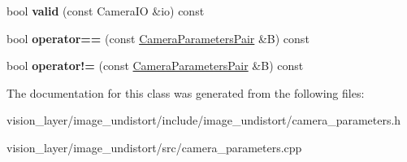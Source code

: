 \begin{DoxyCompactItemize}
bool {\bfseries valid} (const Camera\+IO \&io) const
\item 
\mbox{\label{classimage__undistort_1_1CameraParametersPair_a8eca6daae8442e95a6612f76543a1de9}} 
bool {\bfseries operator==} (const \hyperlink{classimage__undistort_1_1CameraParametersPair}{Camera\+Parameters\+Pair} \&B) const
\item 
\mbox{\label{classimage__undistort_1_1CameraParametersPair_a1e905f613d6a26a8a0f816e2aff61496}} 
bool {\bfseries operator!=} (const \hyperlink{classimage__undistort_1_1CameraParametersPair}{Camera\+Parameters\+Pair} \&B) const
\end{DoxyCompactItemize}


The documentation for this class was generated from the following files\+:\begin{DoxyCompactItemize}
\item 
vision\+\_\+layer/image\+\_\+undistort/include/image\+\_\+undistort/camera\+\_\+parameters.\+h\item 
vision\+\_\+layer/image\+\_\+undistort/src/camera\+\_\+parameters.\+cpp\end{DoxyCompactItemize}
